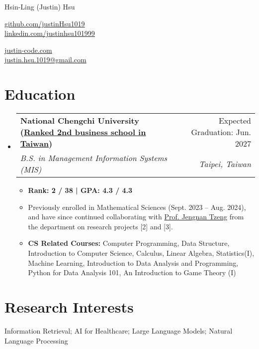 \documentclass[letterpaper,10pt]{article}
\makeatletter
\newcommand{\resumeItem}[1]{
  \item\small{
    {#1 \vspace{-2pt}}
  }
}
\newcommand{\resumeSubheading}[4]{
  \vspace{-2pt}\item
    \begin{tabular*}{0.97\textwidth}[t]{l@{\extracolsep{\fill}}r}
      \textbf{#1} & #2 \\
      \textit{\small#3} & \textit{\small #4} \\
    \end{tabular*}\vspace{-7pt}
}
\newcommand{\resumeSubHeadingListStart}{\begin{itemize}[leftmargin=0.15in, label={}]}
\newcommand{\resumeSubHeadingListEnd}{\end{itemize}}
\newcommand{\resumeItemListStart}{\begin{itemize}}
\newcommand{\resumeItemListEnd}{\end{itemize}\vspace{-5pt}}
\makeatother
\begin{document}
\begin{center}
    {\LARGE Hsin-Ling (Justin) Hsu} \\ \vspace{2pt}
    \begin{multicols}{2}
    \begin{flushleft}
    \href{{https://github.com/justinHsu1019}}{github.com/justinHsu1019}\\
    \href{{https://www.linkedin.com/in/justinhsu101999}}{linkedin.com/justinhsu101999}
    \end{flushleft}

    \begin{flushright}
    \href{{https://justin-code.com}}{justin-code.com}\\
    \href{mailto:justin.hsu.1019@gmail.com}{justin.hsu.1019@gmail.com}
    \end{flushright}
    \end{multicols}
\end{center}

\vspace{-2pt}
\section{Education}
  \resumeSubHeadingListStart
      \resumeSubheading
      {National Chengchi University \normalfont(\href{https://www.eduniversal-ranking.com/business-school-university-ranking-in-taiwan-region-china.html}{Ranked 2nd business school in Taiwan})}{Expected Graduation: Jun. 2027}
      {B.S. in Management Information Systems (MIS)}{Taipei, Taiwan}
      \resumeItemListStart
      \vspace{0.3em}
        \resumeItem{\textbf{Rank: 2 / 38 | GPA: 4.3 / 4.3}}
        \resumeItem{Previously enrolled in Mathematical Sciences (Sept. 2023 -- Aug. 2024), and have since continued collaborating with \href{https://ms.nccu.edu.tw/PageStaffing/Detail?fid=4666\&id=1118}{Prof. Jengnan Tzeng} from the department on research projects [2] and [3].}
        \resumeItem{\textbf{CS Related Courses:} Computer Programming, Data Structure, Introduction to Computer Science, Calculus, Linear Algebra, Statistics(I), Machine Learning, Introduction to Data Analysis and Programming, Python for Data Analysis 101, An Introduction to Game Theory (I)}
      \resumeItemListEnd
  \resumeSubHeadingListEnd

\section{Research Interests}
Information Retrieval; AI for Healthcare; Large Language Models; Natural Language Processing
\end{document}
